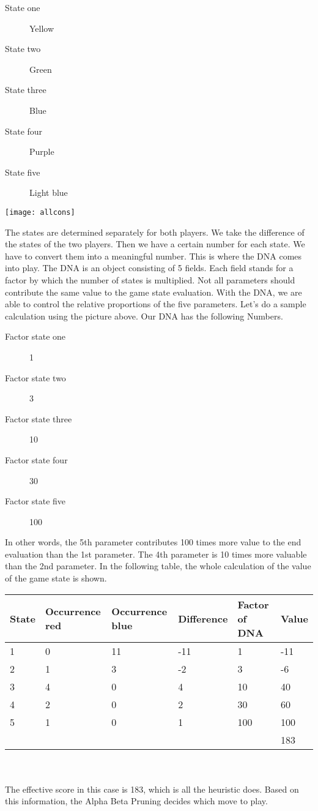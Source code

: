\begin{description}
\item[State one] Yellow
\item[State two] Green
\item[State three] Blue
\item[State four] Purple
\item[State five] Light blue
\end{description}
\begin{fixedpic}
	\centering
	\texttt{[image: allcons]}
\end{fixedpic}
The states are determined separately for both players. We take the difference of the states of the two players.
Then we have a certain number for each state. We have to convert them into a meaningful number. This is where the DNA comes into play. The DNA is an object consisting of 5 fields. Each field stands for a factor by which the number of states is multiplied. Not all parameters should contribute the same value to the game state evaluation. With the DNA, we are able to control the relative proportions of the five parameters. Let's do a sample calculation using the picture above. Our DNA has the following Numbers.\\
\begin{description}
\item[Factor state one] 1
\item[Factor state two] 3
\item[Factor state three] 10
\item[Factor state four] 30
\item[Factor state five] 100
\end{description}

In other words, the 5th parameter contributes 100 times more value to the end evaluation than the 1st parameter. The 4th parameter is 10 times more valuable than the 2nd parameter. In the following table, the whole calculation of the value of the game state is shown.

\begin{tabularx}{\textwidth}{|X|X|X|X|X|X|}
\hline
State & Occurrence red & Occurrence blue & Difference & Factor of DNA & Value \\\hline
1	& 0	& 11	& -11	& 1 	& -11 \\\hline
2	& 1	& 3 	& -2	& 3 	& -6 \\\hline
3	& 4	& 0 	& 4 	& 10	& 40 \\\hline
4	& 2	& 0 	& 2 	& 30	& 60 \\\hline
5	& 1	& 0 	& 1 	& 100	& 100 \\\hline
\multicolumn{5}{X|}{} & 183 \\\cline{6-6}
\end{tabularx}\\
\\
The effective score in this case is 183, which is all the heuristic does. 
Based on this information, the Alpha Beta Pruning decides which move to play.



